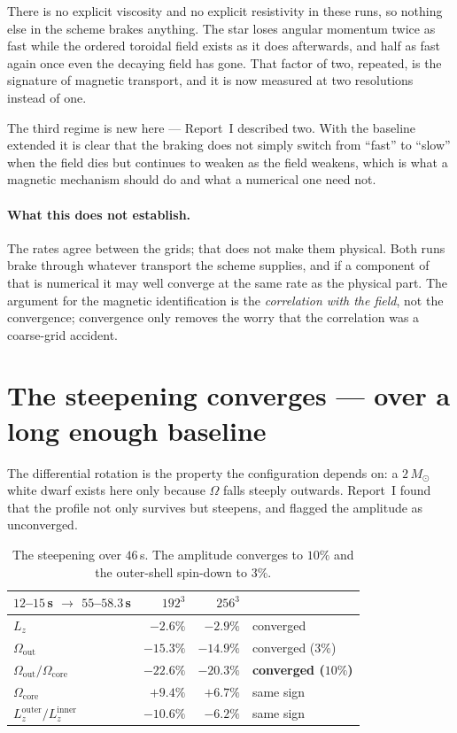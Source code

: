\documentclass[11pt,a4paper]{article}
\newcommand{\Msun}{M_\odot}
\newcommand{\Oout}{\Omega_{\mathrm{out}}}
\newcommand{\Ocore}{\Omega_{\mathrm{core}}}
\begin{document}
There is no explicit viscosity and no explicit resistivity in these runs, so
nothing else in the scheme brakes anything. The star loses angular momentum
twice as fast while the ordered toroidal field exists as it does afterwards,
and half as fast again once even the decaying field has gone. That factor of
two, repeated, is the signature of magnetic transport, and it is now measured
at two resolutions instead of one.

The third regime is new here --- Report~I described two. With the baseline
extended it is clear that the braking does not simply switch from ``fast'' to
``slow'' when the field dies but continues to weaken as the field weakens,
which is what a magnetic mechanism should do and what a numerical one need not.

\paragraph{What this does not establish.} The rates agree between the grids;
that does not make them physical. Both runs brake through whatever transport
the scheme supplies, and if a component of that is numerical it may well
converge at the same rate as the physical part. The argument for the magnetic
identification is the \emph{correlation with the field}, not the convergence;
convergence only removes the worry that the correlation was a coarse-grid
accident.

\section{The steepening converges --- over a long enough baseline}
\label{sec:steep}

The differential rotation is the property the configuration depends on: a
$2\,\Msun$ white dwarf exists here only because $\Omega$ falls steeply outwards.
Report~I found that the profile not only survives but steepens, and flagged the
amplitude as unconverged.

\begin{table}[h]
\centering\small
\begin{tabular}{lrrl}
\toprule
$12$--$15$\,s $\to$ $55$--$58.3$\,s & $192^3$ & $256^3$ & \\
\midrule
$L_z$ & $-2.6\%$ & $-2.9\%$ & converged \\
$\Oout$ & $-15.3\%$ & $-14.9\%$ & converged ($3\%$) \\
$\Oout/\Ocore$ & $\mathbf{-22.6\%}$ & $\mathbf{-20.3\%}$ & \textbf{converged ($10\%$)} \\
$\Ocore$ & $+9.4\%$ & $+6.7\%$ & same sign \\
$L_z^{\mathrm{outer}}/L_z^{\mathrm{inner}}$ & $-10.6\%$ & $-6.2\%$ & same sign \\
\bottomrule
\end{tabular}
\caption{The steepening over $46$\,s. The amplitude converges to $10\%$ and the
outer-shell spin-down to $3\%$.}
\label{tab:steep}
\end{table}
\end{document}
